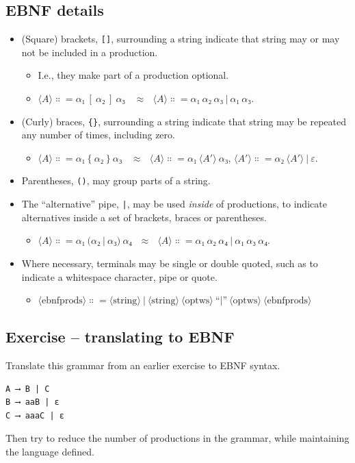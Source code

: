 \documentclass[11pt]{article}
\theoremstyle{definition}
\begin{document}
\subsection{EBNF details}
\label{sec:org91db6d9}
\begin{itemize}
\item (Square) brackets, \texttt{[]}, surrounding a string
indicate that string may or may not be included in a production.
\begin{itemize}
\item I.e., they make part of a production optional.
\item \(⟨A⟩ ∷= α₁\ [\ α₂\ ]\ α₃\ \ \ \ ≈ \ \ \ ⟨A⟩ ∷= α₁\ α₂\ α₃\ |\ α₁\ α₃\).
\end{itemize}
\item (Curly) braces, \texttt{\{\}}, surrounding a string
indicate that string may be repeated any number of times,
including zero.
\begin{itemize}
\item \(⟨A⟩ ∷= α₁\ \{\ α₂\ \}\ α₃\ \ \ \ ≈ \ \ \ ⟨A⟩ ∷= α₁\ ⟨A′⟩\ α₃\), \(⟨A′⟩ ∷= α₂\ ⟨A′⟩\ |\ ε\).
\end{itemize}
\item Parentheses, \texttt{()}, may group parts of a string.
\item The “alternative” pipe, \texttt{|}, may be used \emph{inside} of productions,
to indicate alternatives inside a set of brackets, braces
or parentheses.
\begin{itemize}
\item \(⟨A⟩ ∷= α₁\ (α₂\ |\ α₃)\ α₄ \ \ \ ≈ \ \ \ ⟨A⟩ ∷= α₁\ α₂\ α₄\ |\ α₁\ α₃\ α₄\).
\end{itemize}
\item Where necessary, terminals may be single or double quoted,
such as to indicate a whitespace character, pipe or quote.
\begin{itemize}
\item \(⟨\text{ebnfprods}⟩ ∷= ⟨\text{string}⟩\ |\ ⟨\text{string}⟩\ ⟨\text{optws}⟩\ “|”\ ⟨\text{optws}⟩\ ⟨\text{ebnfprods}⟩\)
\end{itemize}
\end{itemize}

\subsection{Exercise – translating to EBNF}
\label{sec:org6e7cf47}
Translate this grammar from an earlier exercise to EBNF syntax.
\begin{verbatim}
A ⟶ B | C
B ⟶ aaB | ε
C ⟶ aaaC | ε
\end{verbatim}
Then try to reduce the number of productions in the grammar,
while maintaining the language defined.
\end{document}
